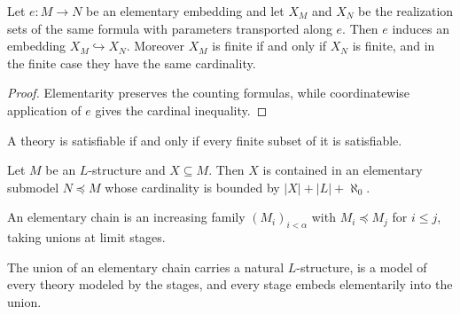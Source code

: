 \begin{lemma}
\label{lem:elementary-embedding-definable-set-cardinality}
\leanok
{}
Let \(e:M\to N\) be an elementary embedding and let \(X_M\) and \(X_N\)
be the realization sets of the same formula with parameters transported
along \(e\).  Then \(e\) induces an embedding \(X_M\hookrightarrow X_N\).
Moreover \(X_M\) is finite if and only if \(X_N\) is finite, and in the
finite case they have the same cardinality.
\end{lemma}

\begin{proof}
\leanok
{}
Elementarity preserves the counting formulas, while coordinatewise
application of \(e\) gives the cardinal inequality.
\end{proof}

\begin{theorem}[Compactness]
\label{thm:compactness}
\mathlibok
A theory is satisfiable if and only if every finite subset of it is
satisfiable.
\end{theorem}

\begin{theorem}
\label{thm:downward-lowenheim-skolem}
\mathlibok
{}
Let \(M\) be an \(L\)-structure and \(X\subseteq M\).  Then \(X\) is
contained in an elementary submodel \(N\preceq M\) whose cardinality is
bounded by \(|X|+|L|+\aleph_0\).
\end{theorem}

\begin{definition}
\label{def:elementary-chain}
\leanok
{}
An elementary chain is an increasing family \((M_i)_{i<\alpha}\) with
\(M_i\preceq M_j\) for \(i\leq j\), taking unions at limit stages.
\end{definition}

\begin{theorem}
\label{thm:elementary-chain-union}
\leanok
{}
The union of an elementary chain carries a natural \(L\)-structure, is a
model of every theory modeled by the stages, and every stage embeds
elementarily into the union.
\end{theorem}

